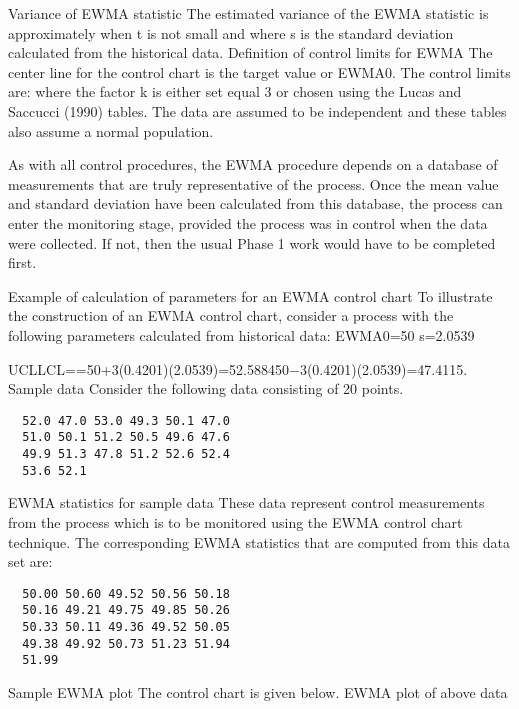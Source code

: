 \documentclass[Charts101.tex]{subfiles}
\begin{document}
\begin{frame}
Variance of EWMA statistic	The estimated variance of the EWMA statistic is approximately
when t is not small and where s is the standard deviation calculated from the historical data.
Definition of control limits for EWMA	The center line for the control chart is the target value or EWMA0. The control limits are:
where the factor k is either set equal 3 or chosen using the Lucas and Saccucci (1990) tables. The data are assumed to be independent and these tables also assume a normal population.
\end{frame}
\begin{frame}
As with all control procedures, the EWMA procedure depends on a database of measurements that are truly representative of the process. Once the mean value and standard deviation have been calculated from this database, the process can enter the monitoring stage, provided the process was in control when the data were collected. If not, then the usual Phase 1 work would have to be completed first.
\end{frame}
\begin{frame}
Example of calculation of parameters for an EWMA control chart	To illustrate the construction of an EWMA control chart, consider a process with the following parameters calculated from historical data:
EWMA0=50
s=2.0539
\end{frame}
\begin{frame}[fragile]
UCLLCL==50+3(0.4201)(2.0539)=52.588450−3(0.4201)(2.0539)=47.4115.
Sample data	Consider the following data consisting of 20 points.
\begin{verbatim}
  52.0 47.0 53.0 49.3 50.1 47.0
  51.0 50.1 51.2 50.5 49.6 47.6
  49.9 51.3 47.8 51.2 52.6 52.4
  53.6 52.1
  \end{verbatim}
\end{frame}
\begin{frame}[fragile]
EWMA statistics for sample data	These data represent control measurements from the process which is to be monitored using the EWMA control chart technique. The corresponding EWMA statistics that are computed from this data set are:
\begin{verbatim}
  50.00 50.60 49.52 50.56 50.18
  50.16 49.21 49.75 49.85 50.26
  50.33 50.11 49.36 49.52 50.05
  49.38 49.92 50.73 51.23 51.94
  51.99
 \end{verbatim}
Sample EWMA plot	The control chart is given below.
EWMA plot of above data
\end{frame}
\end{document}
